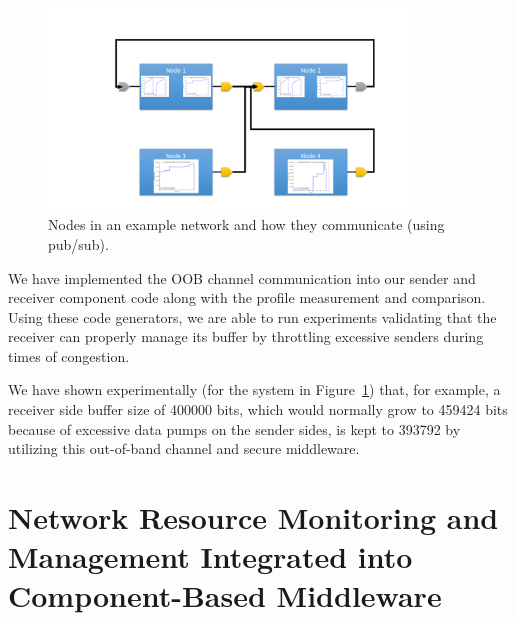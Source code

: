 \begin{figure}[ht!]
  \centering
  \includegraphics[width=0.85\textwidth]{../doc/src/images/results/example_setup.png}
  \caption{Nodes in an example network and how they communicate (using
    pub/sub).}
  \label{fig:ddos}
\end{figure}

We have implemented the OOB channel communication into our sender and
receiver component code along with the profile measurement and
comparison.  Using these code generators, we are able to run
experiments validating that the receiver can properly manage its
buffer by throttling excessive senders during times of congestion. 

We have shown experimentally (for the system in Figure~\ref{fig:ddos})
that, for example, a receiver side buffer size of 400000 bits, which
would normally grow to 459424 bits because of excessive data pumps on
the sender sides, is kept to 393792 by utilizing this out-of-band
channel and secure middleware.

\iffalse

\section{Network Resource Monitoring and Management Integrated into Component-Based Middleware}
\label{sec:drems}

